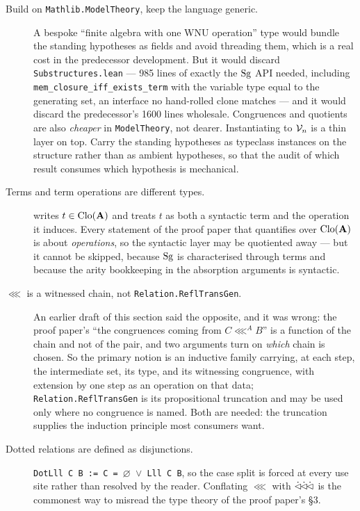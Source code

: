 \begin{description}
\item[Build on \texttt{Mathlib.ModelTheory}, keep the language generic.]
  A bespoke ``finite algebra with one WNU operation'' type would bundle the
  standing hypotheses as fields and avoid threading them, which is a real cost
  in the predecessor development. But it would discard
  \texttt{Substructures.lean} --- 985 lines of exactly the $\operatorname{Sg}$ API needed,
  including \texttt{mem\_closure\_iff\_exists\_term} with the variable type
  equal to the generating set, an interface no hand-rolled clone matches --- and
  it would discard the predecessor's 1600 lines wholesale. Congruences and
  quotients are also \emph{cheaper} in \texttt{ModelTheory}, not dearer.
  Instantiating to $\mathcal V_{n}$ is a thin layer on top. Carry the standing hypotheses
  as typeclass instances on the structure rather than as ambient hypotheses, so
  that the audit of which result consumes which hypothesis is mechanical.

\item[Terms and term operations are different types.]
  \cite{ZhukSimplified} writes $t\in\operatorname{Clo}(\mathbf A)$ and treats $t$ as both a
  syntactic term and the operation it induces. Every statement of the proof
  paper that quantifies over $\operatorname{Clo}(\mathbf A)$ is about \emph{operations}, so
  the syntactic layer may be quotiented away --- but it cannot be skipped,
  because $\operatorname{Sg}$ is characterised through terms and because the arity
  bookkeeping in the absorption arguments is syntactic.

\item[$\lll$ is a witnessed chain, not \texttt{Relation.ReflTransGen}.]
  An earlier draft of this section said the opposite, and it was wrong: the
  proof paper's ``the congruences coming from $C\lll^{A}B$'' is a function of
  the chain and not of the pair, and two arguments turn on \emph{which} chain
  is chosen. So the primary notion is an inductive family carrying, at each
  step, the intermediate set, its type, and its witnessing congruence, with
  extension by one step as an operation on that data;
  \texttt{Relation.ReflTransGen} is its propositional truncation and may be
  used only where no congruence is named. Both are needed: the truncation
  supplies the induction principle most consumers want.

\item[Dotted relations are defined as disjunctions.]
  \texttt{DotLll C B := C = }$\varnothing$\texttt{ }$\vee$\texttt{ Lll C B}, so
  the case split is forced at every use site rather than resolved by the
  reader. Conflating $\lll$ with $\mathrel{\dot{\lhd}\!\dot{\lhd}\!\dot{\lhd}}$ is the commonest way to misread the
  type theory of the proof paper's \S3.


\end{description}
